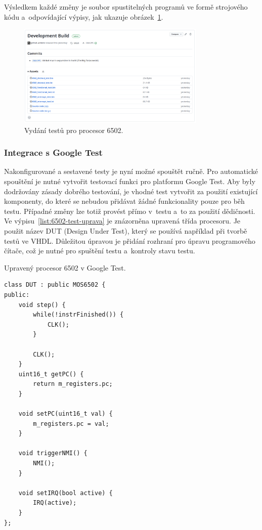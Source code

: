 Výsledkem každé změny je soubor spustitelných programů ve formě strojového kódu a~odpovídající výpisy, jak ukazuje obrázek~\ref{fig:vydani-testu-6502}.

\begin{figure}[ht!]
	\centering
    \includegraphics[width=0.8\textwidth]{images/vydani-testu-6502.png}
    \caption{Vydání testů pro procesor 6502.}
    \label{fig:vydani-testu-6502}
\end{figure}

\subsubsection{Integrace s Google Test}
Nakonfigurované a sestavené testy je nyní možné spouštět ručně. Pro automatické spouštění je nutné vytvořit testovací funkci pro platformu Google Test. Aby byly dodržovány zásady dobrého testování, je vhodné test vytvořit za použití existující komponenty, do které se nebudou přidávat žádné funkcionality pouze pro běh testu. Případné změny lze totiž provést přímo v~testu a~to za použití dědičnosti. Ve výpisu~\ref{list:6502-test-uprava} je znázorněna upravená třída procesoru. Je použit název DUT (Design Under Test), který se používá například při tvorbě testů ve VHDL. Důležitou úpravou je přidání rozhraní pro úpravu programového čítače, což je nutné pro spuštění testu a~kontroly stavu testu.

\begin{listing}[htp!]
	\caption{Upravený procesor 6502 v Google Test.}
	\label{list:6502-test-uprava}
	\begin{verbatim}
class DUT : public MOS6502 {
public:
	void step() {
		while(!instrFinished()) {
			CLK();
		}
		
		CLK();
	}
	uint16_t getPC() {
		return m_registers.pc;
	}

	void setPC(uint16_t val) {
		m_registers.pc = val;
	}

	void triggerNMI() {
		NMI();
	}

	void setIRQ(bool active) {
		IRQ(active);
	}
};
	\end{verbatim}
\end{listing}

